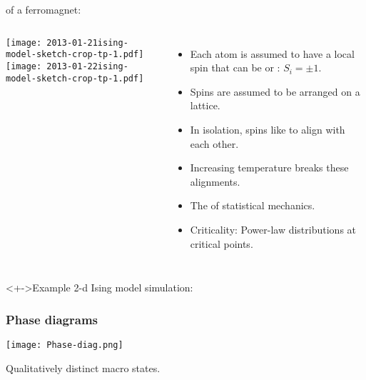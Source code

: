 \begin{frame}
  \small

    \begin{block}{\normalsize {} of a ferromagnet:}
      \small
      \begin{columns}
        \texttt{[image: 2013-01-21ising-model-sketch-crop-tp-1.pdf]}\\
        \texttt{[image: 2013-01-22ising-model-sketch-crop-tp-1.pdf]}
        \begin{itemize}
        \item<+-> 
          Each atom is assumed to have a local spin 
          that can be  or : $ S_i = \pm 1$.
        \item<+-> 
          Spins are assumed to be arranged on a lattice.
        \item<+-> 
          In isolation, spins like to align with each other.
        \item<+-> 
          Increasing temperature breaks these alignments.
        \item<+-> 
          The  of statistical mechanics.
        \item<+-> 
          Criticality: Power-law distributions at critical points.
        \end{itemize}
      \end{columns}
    \end{block}
    \begin{block}<+->{Example 2-d Ising model simulation:}
      \small
    \end{block}

\end{frame}


\begin{frame}
  \frametitle{Phase diagrams}

  \texttt{[image: Phase-diag.png]}

  \medskip

  Qualitatively distinct macro states.

\end{frame}

